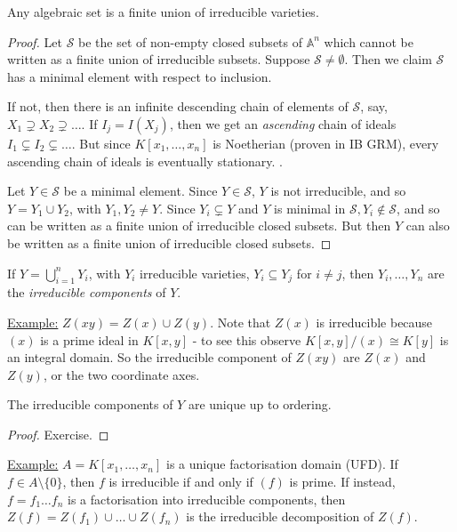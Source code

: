 \documentclass[10pt,a4paper]{article}
\begin{document}
\begin{proposition}
Any algebraic set is a finite union of irreducible varieties.
\end{proposition}
\begin{proof}
Let $\mathcal{S}$ be the set of non-empty closed subsets of $\mathbb{A}^n$ which cannot be written as a finite union of irreducible subsets. Suppose $\mathcal{S} \neq \emptyset$. Then we claim $\mathcal{S}$ has a minimal element with respect to inclusion. 

If not, then there is an infinite descending chain of elements of $\mathcal{S}$, say, $X_1 \supsetneq X_2 \supsetneq \ldots$. If $I_j = I(X_j)$, then we get an \textit{ascending} chain of ideals $I_1 \subsetneq I_2 \subsetneq \ldots$. But since $K[x_1, \ldots, x_n]$ is Noetherian (proven in IB GRM), every ascending chain of ideals is eventually stationary. \contr.

Let $Y \in \mathcal{S}$ be a minimal element. Since $Y \in \mathcal{S}$, $Y$ is not irreducible, and so $Y = Y_1 \cup Y_2$, with $Y_1, Y_2 \neq Y$. Since $Y_i \subsetneq Y$ and $Y$ is minimal in $\mathcal{S}, Y_i \notin \mathcal{S}$, and so can be written as a finite union of irreducible closed subsets. But then $Y$ can also be written as a finite union of irreducible closed subsets.
\end{proof}

If $Y = \bigcup_{i=1}^n Y_i$, with $Y_i$ irreducible varieties, $Y_i \subseteq Y_j$ for $i \neq j$, then $Y_i, \ldots, Y_n$ are the \emph{irreducible components} of $Y$.

\hspace*{-1em}\underline{Example:} $Z(xy) = Z(x)\cup Z(y)$. Note that $Z(x)$ is irreducible because $(x)$ is a prime ideal in $K[x,y]$ - to see this observe $K[x,y]/(x) \cong K[y]$ is an integral domain. So the irreducible component of $Z(xy)$ are $Z(x)$ and $Z(y)$, or the two coordinate axes.

\begin{proposition}
The irreducible components of $Y$ are unique up to ordering.
\end{proposition}
\begin{proof}
Exercise.
\end{proof}

\hspace*{-1em}\underline{Example:} $A = K[x_1, \ldots, x_n]$ is a unique factorisation domain (UFD). If $f \in A\setminus\{0\}$, then $f$ is irreducible if and only if $(f)$ is prime. If instead, $f = f_1\ldots f_n$ is a factorisation into irreducible components, then $Z(f) = Z(f_1)\cup\ldots\cup Z(f_n)$ is the irreducible decomposition  of $Z(f)$.
\end{document}
